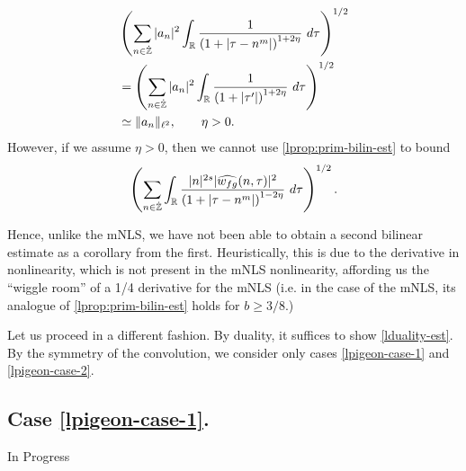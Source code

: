\begin{equation*}
	\begin{split}
		& \left( \sum_{n \in \zzdot} | a_{n} |^2\int_{\rr} \frac{1}{\left( 1 + | \tau -
		n^{m } | \right)^{1 + 2 \eta}} \ d \tau  
		\right)^{1/2} 
		\\
		& = \left ( \sum_{n \in \zzdot}
		| a_n |^2 
		\int_{\rr} \frac{1}{\left( 1 + | \tau' | \right)^{1 + 2 \eta}} \ d 
		\tau \right)^{1/2}
		\\
		& \simeq \|a_n\|_{\ell^2}, \qquad \eta >0.
		\end{split}
\end{equation*}
However, if we assume $\eta >0$, then
we cannot use \cref{lprop:prim-bilin-est} to bound
\begin{equation*}
	\begin{split}
		\left ( \sum_{n \in \dot{\mathbb{Z}}}\int_{\mathbb{R}} \frac{|n|^{2s} | \widehat{w_{fg}}(n, \tau) 
		|^2}{\left( 1 + | \tau - n^{m } | \right)^{1 - 2\eta}}\ d \tau
		\right)^{1/2}. 
	\end{split}
\end{equation*}
\begin{remark}
Hence, unlike the mNLS, we have not been able to obtain a second bilinear
estimate as a corollary from the first. Heuristically, this is due to the
derivative in nonlinearity, which is not present in the mNLS nonlinearity,
affording us the ``wiggle room''  of a 1/4 derivative for the mNLS (i.e. in the case
of the mNLS, its analogue of \cref{lprop:prim-bilin-est} holds for $b \ge
3/8$.)
\end{remark}
%
%
Let us proceed in a different fashion. By duality, it suffices to show
\eqref{lduality-est}. By the symmetry of the convolution, we consider only cases
\eqref{lpigeon-case-1} and \eqref{lpigeon-case-2}.
%
%
\subsection{Case \ref{lpigeon-case-1}.} In Progress
%
%
%
%
